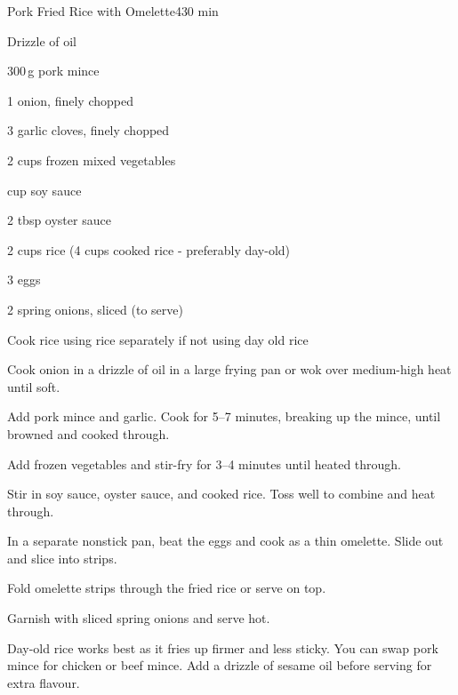 \begin{recipebox}{Pork Fried Rice with Omelette}{4}{30 min}
\begin{ingredients}
  \item Drizzle of oil
  \item 300\,g pork mince
  \item 1 onion, finely chopped
  \item 3 garlic cloves, finely chopped
  \item 2 cups frozen mixed vegetables
  \item {} cup soy sauce
  \item 2 tbsp oyster sauce
  \item 2 cups rice (4 cups cooked rice - preferably day-old)
  \item 3 eggs
  \item 2 spring onions, sliced (to serve)
\end{ingredients}

\begin{method}
  \item Cook rice using rice separately if not using day old rice
  \item Cook onion in a drizzle of oil in a large frying pan or wok over medium-high heat until soft.  
  \item Add pork mince and garlic. Cook for 5–7 minutes, breaking up the mince, until browned and cooked through.  
  \item Add frozen vegetables and stir-fry for 3–4 minutes until heated through.  
  \item Stir in soy sauce, oyster sauce, and cooked rice. Toss well to combine and heat through.  
  \item In a separate nonstick pan, beat the eggs and cook as a thin omelette. Slide out and slice into strips.  
  \item Fold omelette strips through the fried rice or serve on top.  
  \item Garnish with sliced spring onions and serve hot.  
\end{method}

\begin{notes}
Day-old rice works best as it fries up firmer and less sticky.  
You can swap pork mince for chicken or beef mince.  
Add a drizzle of sesame oil before serving for extra flavour.  
\end{notes}
\end{recipebox}